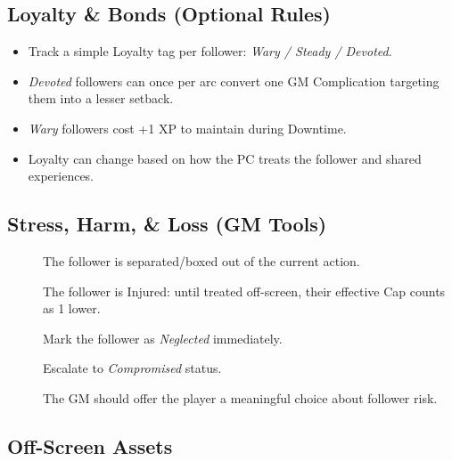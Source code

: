 \subsection{Loyalty \& Bonds (Optional Rules)}
\label{subsec:follower-loyalty}

\begin{itemize}
    \item Track a simple Loyalty tag per follower: \emph{Wary / Steady / Devoted}. 
    \item \emph{Devoted} followers can once per arc convert one GM Complication targeting them into a lesser setback. 
    \item \emph{Wary} followers cost +1 XP to maintain during Downtime. 
    \item Loyalty can change based on how the PC treats the follower and shared experiences.
\end{itemize}

\subsection{Stress, Harm, \& Loss (GM Tools)}
\label{subsec:follower-stress}

\begin{description}
    \item[] The follower is separated/boxed out of the current action. 
    \item[] The follower is Injured: until treated off-screen, their effective Cap counts as 1 lower. 
    \item[] Mark the follower as \emph{Neglected} immediately. 
    \item[] Escalate to \emph{Compromised} status. 
    \item[] The GM should offer the player a meaningful choice about follower risk. 
\end{description}

\subsection{Off-Screen Assets}
\label{subsec:off-screen-assets}

